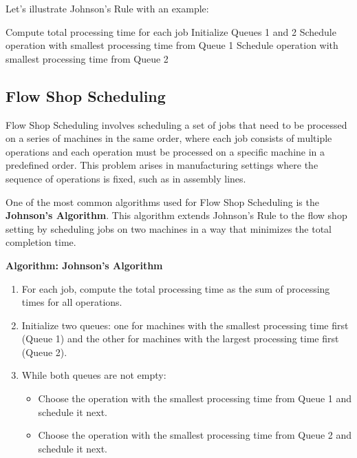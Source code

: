 \documentclass[12pt]{book} %
\begin{document}
Let's illustrate Johnson's Rule with an example:
\FloatBarrier
\FloatBarrier
\begin{algorithm}
\caption{Johnson's Rule}
\begin{algorithmic}[1]
\State Compute total processing time for each job
\State Initialize Queues 1 and 2
    \State Schedule operation with smallest processing time from Queue 1
    \State Schedule operation with smallest processing time from Queue 2
\EndWhile
\EndProcedure
\end{algorithmic}
\end{algorithm}
\FloatBarrier

\subsection{Flow Shop Scheduling}
Flow Shop Scheduling involves scheduling a set of jobs that need to be processed on a series of machines in the same order, where each job consists of multiple operations and each operation must be processed on a specific machine in a predefined order. This problem arises in manufacturing settings where the sequence of operations is fixed, such as in assembly lines.

One of the most common algorithms used for Flow Shop Scheduling is the \textbf{Johnson's Algorithm}. This algorithm extends Johnson's Rule to the flow shop setting by scheduling jobs on two machines in a way that minimizes the total completion time.

\textbf{Algorithm: Johnson's Algorithm}
\begin{enumerate}
    \item For each job, compute the total processing time as the sum of processing times for all operations.
    \item Initialize two queues: one for machines with the smallest processing time first (Queue 1) and the other for machines with the largest processing time first (Queue 2).
    \item While both queues are not empty:
    \begin{itemize}
        \item Choose the operation with the smallest processing time from Queue 1 and schedule it next.
        \item Choose the operation with the smallest processing time from Queue 2 and schedule it next.
    \end{itemize}
\end{enumerate}
\end{document}
